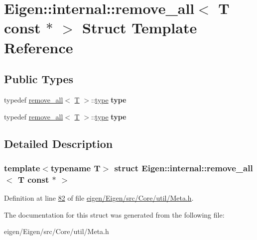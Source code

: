 \hypertarget{struct_eigen_1_1internal_1_1remove__all_3_01_t_01const_01_5_01_4}{}\section{Eigen\+:\+:internal\+:\+:remove\+\_\+all$<$ T const $\ast$ $>$ Struct Template Reference}
\label{struct_eigen_1_1internal_1_1remove__all_3_01_t_01const_01_5_01_4}
\subsection*{Public Types}
\begin{DoxyCompactItemize}
\item 
\mbox{\label{struct_eigen_1_1internal_1_1remove__all_3_01_t_01const_01_5_01_4_a80ee851cf5d48a096726086ade4c65a8}} 
typedef \hyperlink{struct_eigen_1_1internal_1_1remove__all}{remove\+\_\+all}$<$ \hyperlink{group___sparse_core___module}{T} $>$\+::\hyperlink{group___sparse_core___module}{type} {\bfseries type}
\item 
\mbox{\label{struct_eigen_1_1internal_1_1remove__all_3_01_t_01const_01_5_01_4_a80ee851cf5d48a096726086ade4c65a8}} 
typedef \hyperlink{struct_eigen_1_1internal_1_1remove__all}{remove\+\_\+all}$<$ \hyperlink{group___sparse_core___module}{T} $>$\+::\hyperlink{group___sparse_core___module}{type} {\bfseries type}
\end{DoxyCompactItemize}


\subsection{Detailed Description}
\subsubsection*{template$<$typename T$>$\newline
struct Eigen\+::internal\+::remove\+\_\+all$<$ T const $\ast$ $>$}



Definition at line \hyperlink{eigen_2_eigen_2src_2_core_2util_2_meta_8h_source_l00082}{82} of file \hyperlink{eigen_2_eigen_2src_2_core_2util_2_meta_8h_source}{eigen/\+Eigen/src/\+Core/util/\+Meta.\+h}.



The documentation for this struct was generated from the following file\+:\begin{DoxyCompactItemize}
\item 
eigen/\+Eigen/src/\+Core/util/\+Meta.\+h\end{DoxyCompactItemize}
